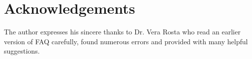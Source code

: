 \documentclass[a4paper,12pt]{article}
\begin{document}
\section{Acknowledgements}
The author expresses his sincere thanks to Dr. Vera Rosta who
read an earlier version of FAQ carefully, found numerous errors
and provided with many helpful suggestions.


\addtolength{\baselineskip}{-0.3\baselineskip}



\end{document}
